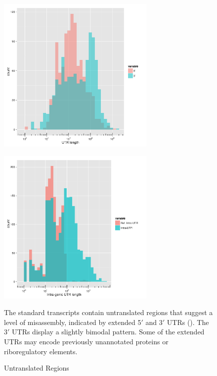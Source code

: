 \begin{figure}
\small
\begin{center}
\begin{minipage}{.5\textwidth}
\begin{center}
{\includegraphics[width=\linewidth,height=3in]{images/Assembly/Summary/futrlength.png}
\label{fig:5.4a}}
\end{center}
\end{minipage}%
\begin{minipage}{.5\textwidth}
\begin{center}
{\includegraphics[width=\linewidth,height=3in]{images/Assembly/Summary/fintrautrlength_1.png}
\label{fig:5.4b}}
\end{center}
\end{minipage}
\end{center}
\caption{Untranslated Regions}
The standard transcripts contain untranslated regions that suggest a level of misassembly, indicated by extended 5$\prime$ and 3$\prime$ UTRs (). The 3$\prime$ UTRs display a slightly bimodal pattern. Some of the extended UTRs may encode previously unannotated proteins or riboregulatory elements.
\end{figure}

